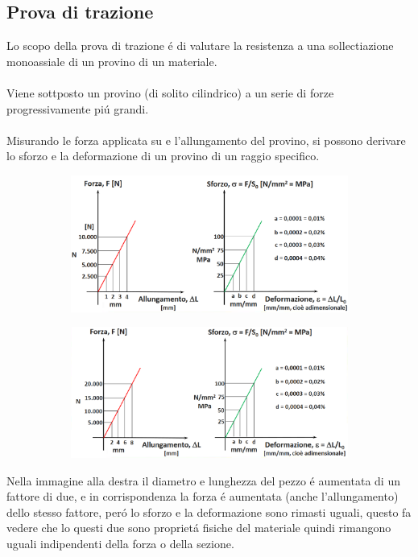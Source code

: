 \documentclass{article}
\begin{document}
        \subsection{Prova di trazione}
            Lo scopo della prova di trazione \'e di valutare la resistenza a una sollectiazione monoassiale di un provino di un materiale.\\ \\
            Viene sottposto un provino (di solito cilindrico) a un serie di forze progressivamente pi\'u grandi.\\ \\
            Misurando le forza applicata su e l'allungamento del provino, si possono derivare lo sforzo e la deformazione di un provino di un raggio specifico.
            \begin{figure}[ht!]
                \centering
                \begin{subfigure}{.45\linewidth}
                    \includegraphics[width=\linewidth]{Diagramma prova di trazione 1.png}
                \end{subfigure}
                \begin{subfigure}{.45\linewidth}
                    \includegraphics[width=\linewidth]{Diagramma prova di trazione 2.png}
                \end{subfigure}
            \end{figure}
            Nella immagine alla destra il diametro e lunghezza del pezzo \'e aumentata di un fattore di due, e in corrispondenza la forza \'e aumentata (anche l'allungamento) dello stesso fattore, per\'o lo sforzo e la deformazione sono rimasti uguali, questo fa vedere che lo questi due sono propriet\'a fisiche del materiale quindi rimangono uguali indipendenti della forza o della sezione.
\end{document}
